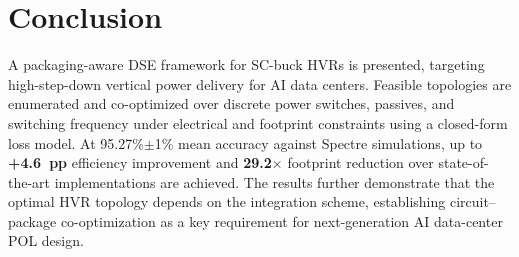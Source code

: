 \documentclass[conference]{IEEEtran}
\begin{document}
\section{Conclusion}
A packaging-aware DSE framework for SC-buck HVRs is presented, targeting high-step-down vertical power delivery for AI data centers. Feasible topologies are enumerated and co-optimized over discrete power switches, passives, and switching frequency under electrical and footprint constraints using a closed-form loss model. At 95.27\%$\pm$1\% mean accuracy against Spectre simulations, up to \textbf{+4.6~pp} efficiency improvement and \textbf{29.2$\times$}
footprint reduction over state-of-the-art implementations are achieved. The results further demonstrate that the optimal HVR topology depends on the integration scheme, establishing circuit--package co-optimization as a key requirement for next-generation AI data-center POL design.







\end{document}
